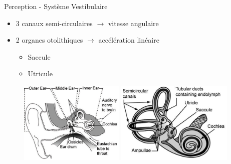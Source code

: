 {
\begin{frame}{Perception - Système Vestibulaire}
\begin{itemize}
\item 3 canaux semi-circulaires $\rightarrow$ vitesse angulaire
\item 2 organes otolithiques $\rightarrow$ accélération linéaire
\begin{itemize}
\item Saccule
\item Utricule
\end{itemize}
\end{itemize}
\begin{figure}
\centering
\includegraphics[width=5cm]{images/innerear}
\includegraphics[width=5.6cm]{images/vestibular}
\end{figure}
\end{frame}
}

